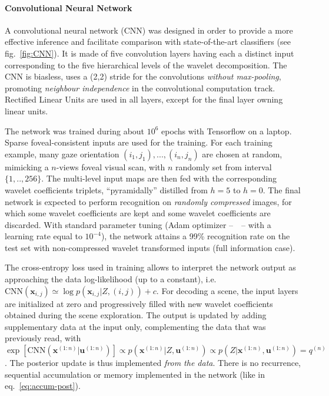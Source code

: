 \documentclass[12pt,twoside,openright]{article}
\begin{document}
\paragraph{Convolutional Neural Network}
A convolutional neural network (CNN) was designed in order to provide a more effective inference and facilitate comparison with state-of-the-art classifiers (see fig.~\ref{fig:CNN}). 
It is made of five convolution layers having each a distinct input corresponding to the five hierarchical levels of the wavelet decomposition. 
The CNN is biasless, uses a (2,2) stride for the convolutions \emph{without max-pooling}, promoting \emph{neighbour independence} in the convolutional computation track.
Rectified Linear Units are used in all layers, except for the final layer owning linear units. 

The network was trained during about $10^6$ epochs with Tensorflow on a laptop.
Sparse foveal-consistent inputs are used for the training. For each training example, many gaze orientation $(i_1,j_1), ..., (i_n,j_n)$ are chosen at random, mimicking a $n$-views foveal visual scan, with $n$ randomly set from interval $\{1,..,256\}$. The multi-level input maps are then fed with the corresponding wavelet coefficients triplets, “pyramidally” distilled from $h = 5$ to $h = 0$. The final network is expected to perform recognition on \emph{randomly compressed} images, for which some wavelet coefficients are kept and some wavelet coefficients are discarded. With standard parameter tuning (Adam optimizer --~\citet{kingma2014adam}~-- with a learning rate equal to $10^{-4}$), the network attains a 99\% recognition rate on the test set with non-compressed wavelet transformed inputs (full information case). 


The cross-entropy loss used in training allows to interpret the network output as  approaching the data log-likelihood (up to a constant), i.e. $\text{CNN}(\boldsymbol{x}_{i,j}) \simeq \log p(\boldsymbol{x}_{i,j}|Z,(i,j)) + c$. For decoding a scene, the input layers are initialized at zero  and progressively filled with new wavelet coefficients obtained during the scene exploration.
The output is updated by adding supplementary data at the input only, complementing the data that was previously read,  with $\exp \left[\text{CNN}(\boldsymbol{x}^{(1:n)}|\boldsymbol{u}^{(1:n)})\right] \propto p(\boldsymbol{x}^{(1:n)}|Z,\boldsymbol{u}^{(1:n)}) \propto p(Z|\boldsymbol{x}^{(1:n)},\boldsymbol{u}^{(1:n)}) = q^{(n)}$. The posterior update is thus implemented \emph{from the data}. There is no recurrence, sequential accumulation or memory implemented in the network (like in eq.~\ref{eq:accum-post}). 
\end{document}

